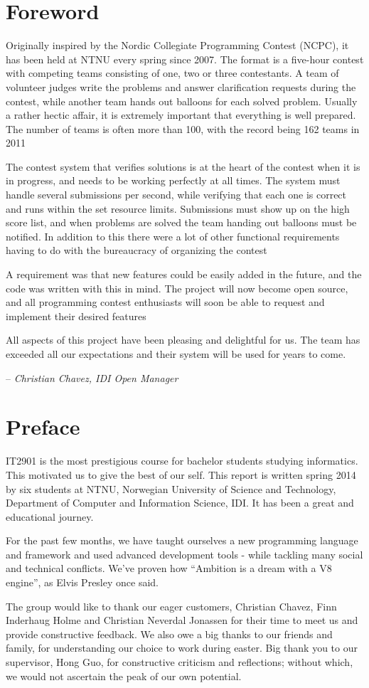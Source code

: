 \section*{Foreword}
Originally inspired by the Nordic Collegiate Programming Contest (NCPC),
it has been held at NTNU every spring since 2007. The format is a
five-hour contest with competing teams consisting of one, two or three
contestants. A team of volunteer judges write the problems and answer
clarification requests during the contest, while another team hands out
balloons for each solved problem. Usually a rather hectic affair, it is
extremely important that everything is well prepared. The number of
teams is often more than 100, with the record being 162 teams in 2011

The contest system that verifies solutions is at the heart of the
contest when it is in progress, and needs to be working perfectly at
all times. The system must handle several submissions per second, while
verifying that each one is correct and runs within the set resource
limits. Submissions must show up on the high score list, and when
problems are solved the team handing out balloons must be notified. In
addition to this there were a lot of other functional requirements
having to do with the bureaucracy of organizing the contest

A requirement was that new features could be easily added in the future,
and the code was written with this in mind. The project will now become
open source, and all programming contest enthusiasts will soon be able
to request and implement their desired features

All aspects of this project have been pleasing and delightful for us.
The team has exceeded all our expectations and their system will be
used for years to come.

\hfill -- \textit{Christian Chavez, IDI Open Manager}

\pagebreak

\section*{Preface}

IT2901 is the most prestigious course for bachelor students studying
informatics. This motivated us to give the best of our self. This report is
written spring 2014 by six students at NTNU, Norwegian University of Science
and Technology, Department of Computer and Information Science, IDI. It has
been a great and educational journey. 

For the past few months, we have taught ourselves a new programming language
and framework and used advanced development tools - while tackling many social
and technical conflicts.  We’ve proven how ``Ambition is a dream with a V8
engine'', as Elvis Presley once said. 

The group would like to thank our eager customers, Christian Chavez, Finn
Inderhaug Holme and Christian Neverdal Jonassen for their time to meet us and
provide constructive feedback. We also owe a big  thanks to our friends and
family, for understanding our choice to work during easter. Big thank you to
our supervisor, Hong Guo, for constructive criticism and reflections; without
which, we would not ascertain the peak of our own potential.
